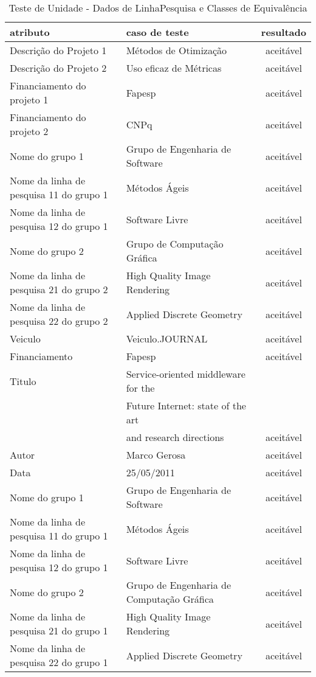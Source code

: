 \documentclass[11pt, a4paper]{book}
\begin{document}
\begin{table}
\renewcommand{\arraystretch}{1.3}
 \caption{Teste de Unidade - Dados de LinhaPesquisa e Classes de Equivalência}
  \label{tab:table5}
\centering
\begin{tabular}[htb]{l|l|c}
\hline\hline
atributo & caso de teste & resultado\\
\hline
Descrição do Projeto 1 & Métodos de Otimização & aceitável \\
Descrição do Projeto 2 & Uso eficaz de Métricas & aceitável \\
Financiamento do projeto 1& Fapesp & aceitável \\
Financiamento do projeto 2&CNPq & aceitável \\
Nome do grupo 1 & Grupo de Engenharia de Software & aceitável \\
Nome da linha de pesquisa 11 do grupo 1 & Métodos Ágeis & aceitável \\
Nome da linha de pesquisa 12 do grupo 1 & Software Livre & aceitável\\
Nome do grupo 2 & Grupo de Computação Gráfica & aceitável\\
Nome da linha de pesquisa 21 do grupo 2 & High Quality Image Rendering & aceitável\\
Nome da linha de pesquisa 22 do grupo 2 & Applied Discrete Geometry & aceitável\\
Veiculo & Veiculo.JOURNAL & aceitável \\
Financiamento & Fapesp & aceitável \\
Titulo & Service-oriented middleware for the & \\
          &  Future Internet: state of the art&\\
         & and research directions & aceitável \\
Autor & Marco Gerosa & aceitável \\
Data & 25/05/2011 & aceitável\\
Nome do grupo 1 & Grupo de Engenharia de Software & aceitável\\
Nome da linha de pesquisa 11 do grupo 1 & Métodos Ágeis & aceitável\\
Nome da linha de pesquisa 12 do grupo 1 & Software Livre & aceitável\\

Nome do grupo 2 & Grupo de Engenharia de Computação Gráfica & aceitável\\
Nome da linha de pesquisa 21 do grupo 1 & High Quality Image Rendering & aceitável\\
Nome da linha de pesquisa 22 do grupo 1 & Applied Discrete Geometry & aceitável\\

\hline 
\end{tabular}
\end{table}
\end{document}
